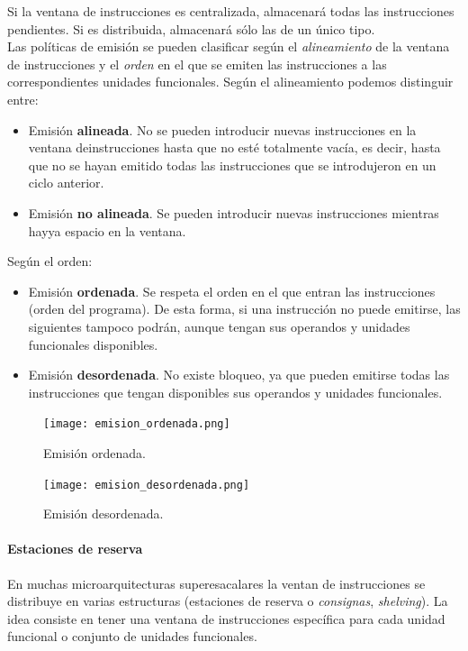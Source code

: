 \documentclass[12pt,spanish]{article}
\begin{document}
Si la ventana de instrucciones es centralizada, almacenará todas las instrucciones pendientes. Si es distribuida, almacenará sólo las de un único tipo.\\

Las políticas de emisión se pueden clasificar según el \emph{alineamiento} de la ventana de instrucciones y el \emph{orden} en el que se emiten las instrucciones a las correspondientes unidades funcionales. Según el alineamiento podemos distinguir entre:

\begin{itemize}
	\item Emisión \textbf{alineada}. No se pueden introducir nuevas instrucciones en la ventana deinstrucciones hasta que no esté totalmente vacía, es decir, hasta que no se hayan emitido todas las instrucciones que se introdujeron en un ciclo anterior.
	\item Emisión \textbf{no alineada}. Se pueden introducir nuevas instrucciones mientras hayya espacio en la ventana.
\end{itemize}

Según el orden:

\begin{itemize}
	\item Emisión \textbf{ordenada}. Se respeta el orden en el que entran las instrucciones (orden del programa). De esta forma, si una instrucción no puede emitirse, las siguientes tampoco podrán, aunque tengan sus operandos y unidades funcionales disponibles.
	\item Emisión \textbf{desordenada}. No existe bloqueo, ya que pueden emitirse todas las instrucciones que tengan disponibles sus operandos y unidades funcionales.
\end{itemize}

\begin{figure}[H]
\centering
\texttt{[image: emision\_ordenada.png]}
\caption{Emisión ordenada.}
\end{figure}

\begin{figure}[H]
\centering
\texttt{[image: emision\_desordenada.png]}
\caption{Emisión desordenada.}
\end{figure}

\paragraph{Estaciones de reserva\\}

En muchas microarquitecturas superesacalares la ventan de instrucciones se distribuye en varias estructuras (estaciones de reserva o \emph{consignas}, \textit{shelving}). La idea consiste en tener una ventana de instrucciones específica para cada unidad funcional o conjunto de unidades funcionales.\\
\end{document}
